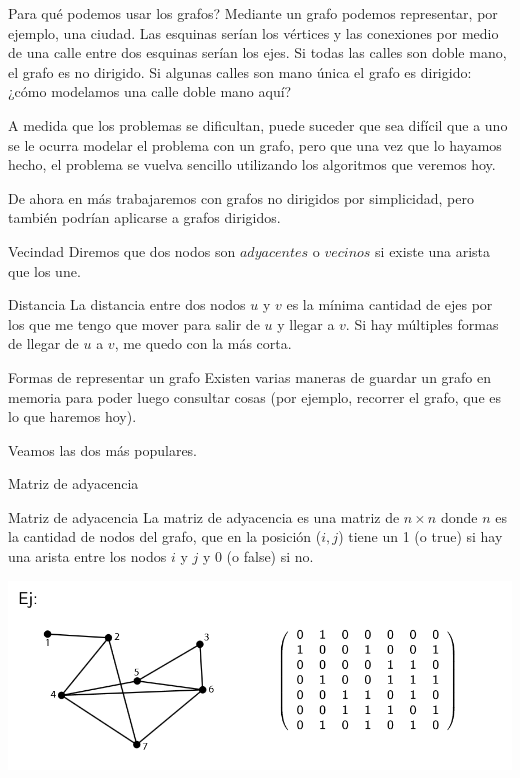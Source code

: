 \documentclass[compress]{beamer}
\begin{document}
\begin{frame}{\textquestiondown Para qué podemos usar los grafos?}
Mediante un grafo podemos representar, por ejemplo, una ciudad. Las esquinas serían los vértices y las conexiones por medio de una calle entre dos esquinas serían los ejes. Si todas las calles son doble mano, el grafo es no dirigido.
Si algunas calles son mano única el grafo es dirigido: ¿cómo modelamos una calle doble mano aquí?

\bigskip
A medida que los problemas se dificultan, puede suceder que sea difícil que a uno se le ocurra modelar el problema con un grafo, pero que una vez que lo hayamos hecho, el problema se vuelva sencillo utilizando los algoritmos que veremos hoy. 

\end{frame}

\begin{frame}
De ahora en más trabajaremos con grafos no dirigidos por simplicidad, pero también podrían aplicarse a grafos dirigidos.

\begin{block}{Vecindad}
Diremos que dos nodos son $adyacentes$ o $vecinos$ si existe una arista que los une.
\end{block}

\begin{block}{Distancia}
La distancia entre dos nodos $u$ y $v$ es la mínima cantidad de ejes por los que me tengo que mover para salir de $u$ y llegar a $v$. Si hay múltiples formas de llegar de $u$ a $v$, me quedo con la más corta.
\end{block}

\end{frame}

\begin{frame}{Formas de representar un grafo}
Existen varias maneras de guardar un grafo en memoria para poder luego consultar cosas (por ejemplo, recorrer el grafo, que es lo que haremos hoy).

Veamos las dos más populares.
\end{frame}

\begin{frame}{Matriz de adyacencia}
\begin{block}{Matriz de adyacencia}
La matriz de adyacencia es una matriz de $n \times n$ donde $n$ es la cantidad de nodos del grafo, que en la posición ($i,j$) tiene un 1 (o true) si hay una arista entre los nodos $i$ y $j$ y 0 (o false) si no.
\end{block}

\includegraphics[scale=0.5]{matriz-adyacencia.png}
\end{frame}
\end{document}
